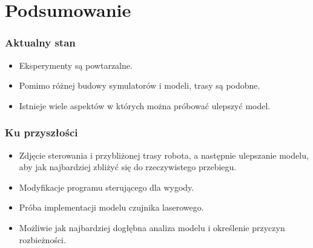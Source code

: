 \documentclass{beamer}
\begin{document}
	
	\section{Podsumowanie}
	\begin{frame}
		\frametitle{Aktualny stan}
		\begin{itemize}
			\item Eksperymenty są powtarzalne.
			\item Pomimo różnej budowy symulatorów i modeli, trasy są podobne.
			\item Istnieje wiele aspektów w których można próbować ulepszyć model.
		\end{itemize}
	\end{frame}
 
	\begin{frame}
		\frametitle{Ku przyszłości}
		\begin{itemize}
			\item Zdjęcie sterowania i przybliżonej trasy robota, a następnie ulepszanie modelu, aby jak najbardziej zbliżyć się do rzeczywistego przebiegu.
			\item Modyfikacje programu sterującego dla wygody.
			\item Próba implementacji modelu czujnika laserowego.
			\item Możliwie jak najbardziej dogłębna analiza modelu i określenie przyczyn rozbieżności.
		\end{itemize}
	\end{frame}
\end{document}
